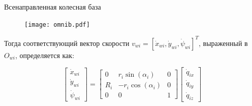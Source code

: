 \documentclass[newPxFont,numfooter,sectionpages]{beamer}
\begin{document}
	

\begingroup
{}
\begin{frame}[plain]
	
	
	\begin{center}
\end{center}	
\end{frame}
\endgroup

\begin{frame}{Всенаправленная колесная база}
	\begin{center}
		\begin{figure}[H]
		\center
		\renewcommand{\figurename}{}
		\texttt{[image: omnib.pdf]}
		\label{fig:scr11}
	\end{figure}
		\begin{minipage}[b]{0.9\textwidth}
Тогда соответствующий вектор скорости $v_{wi} = [\dot{x}_{wi}, \dot{y}_{wi}, \dot{\psi}_{wi}]^T$, выраженный в $O_{wi}$, определяется как:

\begin{equation*}
\begin{bmatrix}
\dot{x}_{wi}\\[1mm] \dot{y}_{wi}\\[1mm] \dot{\psi}_{wi}
\end{bmatrix} = 
\begin{bmatrix}
0 & r_i\sin(\alpha_i) & 0\\[1mm]
R_i & -r_i\cos(\alpha_i) & 0\\[1mm]
0 & 0 & 1
\end{bmatrix}
\begin{bmatrix}
\dot{q}_{ix}\\[1mm] \dot{q}_{iy}\\[1mm] \dot{q}_{iz}
\end{bmatrix}
\end{equation*}
		\end{minipage}
	\end{center}
\end{frame}
\end{document}
